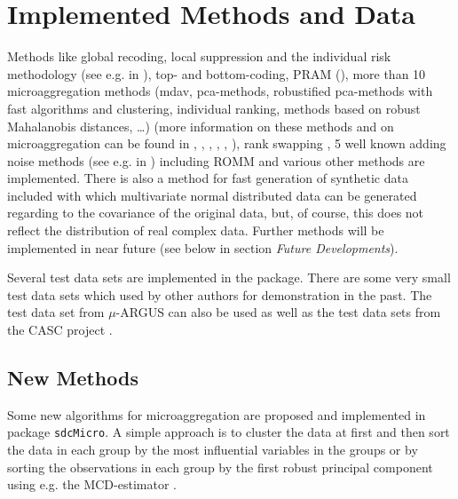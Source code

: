 \documentclass[12pt]{article}
\begin{document}
\section{Implemented Methods and Data}

Methods like global recoding, local suppression and the individual risk methodology (see e.g. in \cite{Franconi04}), top- and bottom-coding, PRAM (\cite{Kooiman97}), more than 10 microaggregation methods (mdav, pca-methods, robustified pca-methods with fast algorithms and clustering, individual ranking, methods based on robust Mahalanobis distances, \ldots) (more information on these methods and on microaggregation can be found in \cite{Templ06}, \cite{Anwar93}, \cite{Elliot05}, \cite{Defays93}, \cite{Defays98}, \cite{Domingo02}), rank swapping \cite{Dalenius82}, 5 well known adding noise methods (see e.g. in \cite{Brand04}) including ROMM \citep{Ting05} and various other methods are implemented. There is also a method for fast generation of synthetic data included \cite{Sanz04} with which multivariate normal distributed data can be generated regarding to the covariance of the original data, but, of course, this does not reflect the distribution of real complex data. Further methods will be implemented in near future (see below in section {\it Future Developments}).

Several test data sets are implemented in the package. There are some very small test data sets which used by other authors for demonstration in the past. The test data set from $\mu$-ARGUS \cite{Hundepool06mu} can also be used as well as the test data sets from the CASC project \citep{HundepoolCASC04}. 

\subsection{New Methods}
\label{new}

Some new algorithms for microaggregation are proposed and implemented in package {\tt sdcMicro}. 
A simple approach is to cluster the data at first and then sort the data in each group by the most influential variables in the groups or by sorting the observations in each group by the first robust principal component using e.g. the MCD-estimator \citep{Rousseeuw84}. 
\end{document}
